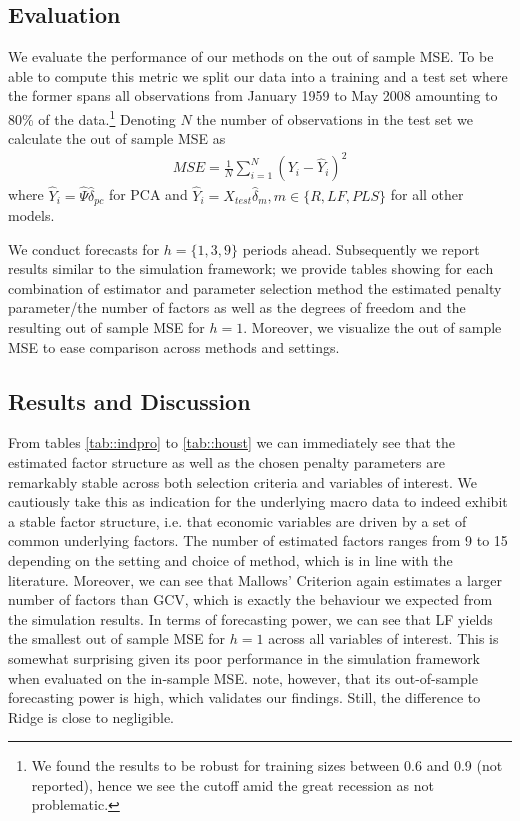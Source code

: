 \subsection{Evaluation}
We evaluate the performance of our methods on the out of sample MSE. To be able to compute this metric we split our data into a training and a test set where the former spans all observations from January 1959 to May 2008 amounting to 80\% of the data.\footnote{We found the results to be robust for training sizes between 0.6 and 0.9 (not reported), hence we see the cutoff amid the great recession as not problematic.} Denoting $N$ the number of observations in the test set we calculate the out of sample MSE as
\begin{align*}
	    MSE = \frac{1}{N} \sum_{i=1}^N (Y_i - \widehat{Y}_i)^2
\end{align*}
where $\widehat{Y}_i = \widehat{\Psi} \widehat{\delta}_{pc}$ for PCA and $\widehat{Y}_i = X_{test} \widehat{\delta}_{m}, m \in \{R, LF, PLS\}$ for all other models. 

We conduct forecasts for $h = \{1, 3, 9\}$ periods ahead. Subsequently we report results similar to the simulation framework; we provide tables showing for each combination of estimator and parameter selection method the estimated penalty parameter/the number of factors as well as the degrees of freedom and the resulting out of sample MSE for $h=1$. Moreover, we visualize the out of sample MSE to ease comparison across methods and settings.

\subsection{Results and Discussion}
From tables \ref{tab::indpro} to \ref{tab::houst} we can immediately see that the estimated factor structure as well as the chosen penalty parameters are remarkably stable across both selection criteria and variables of interest. We cautiously take this as indication for the underlying macro data to indeed exhibit a stable factor structure, i.e. that economic variables are driven by a set of common underlying factors. \parencite{mccracken2016fred} The number of estimated factors ranges from 9 to 15 depending on the setting and choice of method, which is in line with the literature. \parencite{mccracken2016fred}
Moreover, we can see that Mallows' Criterion again estimates a larger number of factors than GCV, which is exactly the behaviour we expected from the simulation results. 
In terms of forecasting power, we can see that LF yields the smallest out of sample MSE for $h=1$ across all variables of interest. This is somewhat surprising given its poor performance in the simulation framework when evaluated on the in-sample MSE. \citeauthor{carrasco2016sample} note, however, that its out-of-sample forecasting power is high, which validates our findings. Still, the difference to Ridge is close to negligible. 

